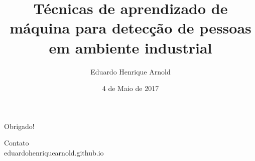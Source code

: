 \documentclass{beamer}
\title{Técnicas de aprendizado de máquina para detecção de pessoas em ambiente industrial}
\date{4 de Maio de 2017}
\author{Eduardo Henrique Arnold}
\institute{Universidade Federal de Santa Catarina}
\begin{document}
	\maketitle

	
	
	
	
	

	\begin{frame}[standout]
	  Obrigado!
		\vspace{3cm}

		Contato\\
		eduardohenriquearnold.github.io
	\end{frame}
\end{document}
